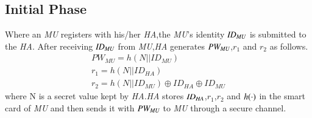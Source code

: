 \documentclass[letter]{ieice}%
\begin{document}
\subsection{Initial Phase}
Where an \emph{MU} registers with his/her \emph{HA},the \emph{MU}'s identity $\emph{ID}_{\emph{MU}}$ is submitted to the \emph{HA}. After receiving $\emph{ID}_{\emph{MU}}$ from \emph{MU},\emph{HA} generates $\emph{PW}_{\emph{MU}}$,$r_1$ and $r_2$ as follows.\\
\begin{eqnarray}
PW_{MU}=h(N||ID_{MU})\\
r_1=h(N||ID_{HA})\\
r_2=h(N||ID_{MU})\oplus {ID}_{HA}\oplus {ID}_{MU}
\end{eqnarray}
where N is a secret value kept by \emph{HA}.\emph{HA} stores $\emph{ID}_{\emph{HA}}$,$r_1$,$r_2$ and $\emph{h}(\cdot)$ in the smart card of \emph{MU} and then sends it with $\emph{PW}_{\emph{MU}}$ to \emph{MU} through a secure channel.
\end{document}
